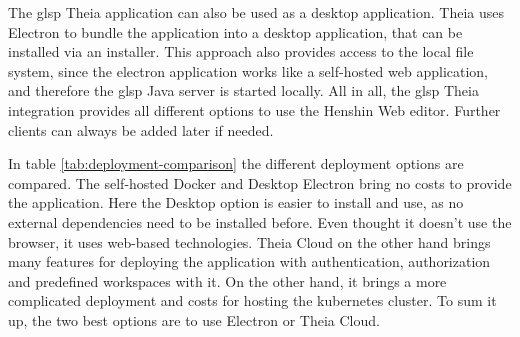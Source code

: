   The \ac{glsp} Theia application can also be used as a desktop application. Theia uses Electron \cite{electron-repo} to bundle the application into a desktop application, that can be installed via an installer. This approach also provides access to the local file system, since the electron application works like a self-hosted web application, and therefore the \ac{glsp} Java server is started locally. All in all, the \ac{glsp} Theia integration provides all different options to use the Henshin Web editor. Further clients can always be added later if needed.

  In table \ref{tab:deployment-comparison} the different deployment options are compared. The self-hosted Docker and Desktop Electron bring no costs to provide the application. Here the Desktop option is easier to install and use, as no external dependencies need to be installed before. Even thought it doesn't use the browser, it uses web-based technologies. Theia Cloud on the other hand brings many features for deploying the application with authentication, authorization and predefined workspaces with it. On the other hand, it brings a more complicated deployment and costs for hosting the kubernetes cluster. To sum it up, the two best options are to use Electron or Theia Cloud.

  